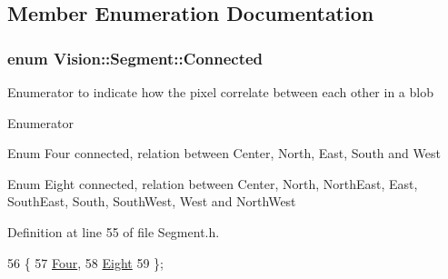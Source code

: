 \subsection{Member Enumeration Documentation}
\hypertarget{class_vision_1_1_segment_a330240c08320e72270fac0aa83d5e27e}{}
\subsubsection[{Connected}]{\setlength{\rightskip}{0pt plus 5cm}enum {\bf Vision\+::\+Segment\+::\+Connected}}\label{class_vision_1_1_segment_a330240c08320e72270fac0aa83d5e27e}
Enumerator to indicate how the pixel correlate between each other in a blob \begin{Desc}
\item[Enumerator]\par
\begin{description}
\item[{\em 
\hypertarget{class_vision_1_1_segment_a330240c08320e72270fac0aa83d5e27ea1fca5ab1c285c0edd2bdc3072cab0c01}{}Four\label{class_vision_1_1_segment_a330240c08320e72270fac0aa83d5e27ea1fca5ab1c285c0edd2bdc3072cab0c01}
}]Enum Four connected, relation between Center, North, East, South and West \item[{\em 
\hypertarget{class_vision_1_1_segment_a330240c08320e72270fac0aa83d5e27eae8e2b0fa6d15448f10cddc0390284a39}{}Eight\label{class_vision_1_1_segment_a330240c08320e72270fac0aa83d5e27eae8e2b0fa6d15448f10cddc0390284a39}
}]Enum Eight connected, relation between Center, North, North\+East, East, South\+East, South, South\+West, West and North\+West \end{description}
\end{Desc}


Definition at line 55 of file Segment.\+h.


\begin{DoxyCode}
56         \{
57             \hyperlink{class_vision_1_1_segment_a330240c08320e72270fac0aa83d5e27ea1fca5ab1c285c0edd2bdc3072cab0c01}{Four},   
58             \hyperlink{class_vision_1_1_segment_a330240c08320e72270fac0aa83d5e27eae8e2b0fa6d15448f10cddc0390284a39}{Eight}  
59         \};
\end{DoxyCode}
\hypertarget{class_vision_1_1_segment_af3a2b992526eac54bca53e34cf2db4da}{}
